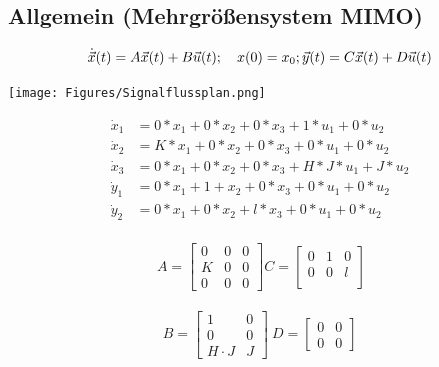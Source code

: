 \documentclass[10pt,a4paper]{article}
\begin{document}
  \subsection{Allgemein (Mehrgrößensystem MIMO) }
  \begin{mdframed}[style=exercise]
    \begin{equation}
      \dot{\Vec{x}}(t) = A\vec{x}(t) + B\vec{u}(t); \quad x(0) = x_{0}; \\*
      \vec{y}(t) = C\vec{x}(t) + D\vec{u}(t)
    \end{equation}
  \end{mdframed}
  \begin{center}
    \texttt{[image: Figures/Signalflussplan.png]}
  \end{center}
  \begin{mdframed}[style=exercise]
    \begin{align*}
      \dot{x}_{1} &= 0*x_{1} +0*x_{2} +0*x_{3} +1*u_{1}+0*u_{2} \\
      \dot{x}_{2} &= K*x_{1} +0*x_{2} +0*x_{3} +0*u_{1}+0*u_{2} \\
      \dot{x}_{3} &= 0*x_{1} +0*x_{2} +0*x_{3} +H*J*u_{1}+J*u_{2} \\
      \dot{y}_{1} &= 0*x_{1} +1+x_{2} +0*x_{3} +0*u_{1}+0*u_{2} \\
      \dot{y}_{2} &= 0*x_{1} +0*x_{2} +l*x_{3} +0*u_{1}+0*u_{2} \\
    \end{align*}
  \end{mdframed}
  \begin{mdframed}[style=exercise]
   \[
        \ A = \begin{bmatrix}
            0&0&0\\
            K&0&0\\
            0&0&0
        \end{bmatrix}
        C = \begin{bmatrix}
            0&1&0\\
            0&0&l\\
        \end{bmatrix}\]\\
        \[B = \begin{bmatrix}
            1&0\\
            0&0\\
            H\cdot{}J&J
        \end{bmatrix} \
        D = \begin{bmatrix}
            0&0\\
            0&0
        \end{bmatrix}\]

  \end{mdframed}
\end{document}
